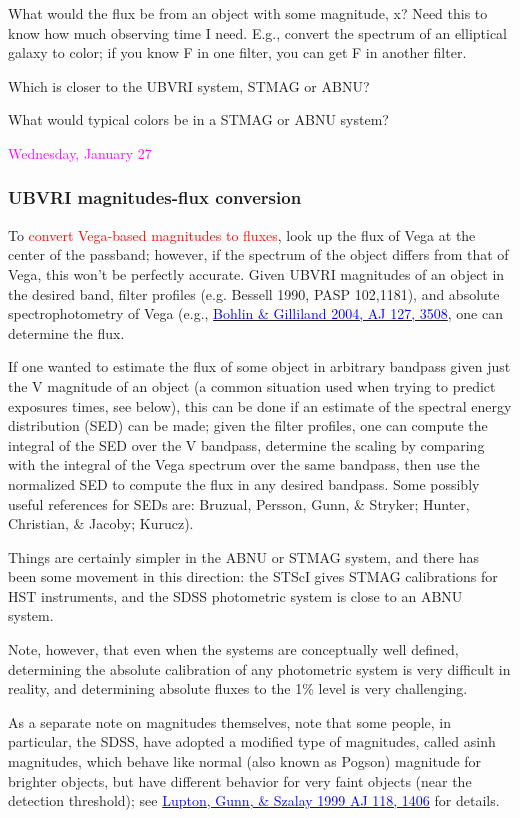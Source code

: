 \documentclass[12pt]{article}
\begin{document}
What would the flux be from an object with some magnitude,
x? Need this to know how much observing time I need. E.g., convert the
spectrum of an elliptical galaxy to color; if you know F in one
filter, you can get F in another filter.

Which is closer to the UBVRI system, STMAG or ABNU?

What would typical colors be in a STMAG or ABNU system?

\textcolor{magenta}{Wednesday, January 27}

\subsubsection*{UBVRI magnitudes-flux conversion
}
To \textcolor{red}{convert Vega-based magnitudes to fluxes},
look up the flux of Vega at the center of the passband;
however, if the spectrum of the object
differs from that of Vega, this won't be perfectly accurate.
Given UBVRI magnitudes of an object in the desired band, filter profiles
(e.g. Bessell 1990, PASP 102,1181), and absolute spectrophotometry of
Vega (e.g., \href{http://adsabs.harvard.edu/abs/2004AJ....127.3508B}
{\textcolor{blue}{Bohlin \& Gilliland 2004, AJ 127, 3508}},
one can determine the flux.

If one wanted to estimate the flux of some object in
arbitrary bandpass given just the V magnitude of an object (a common
situation used when trying to predict exposures times, see below),
this can be done if an estimate of the spectral energy distribution
(SED) can be made; given the filter profiles, one can compute the
integral of the SED over the V bandpass, determine the scaling by
comparing with the integral of the Vega spectrum over the same
bandpass, then use the normalized SED to compute the flux in any
desired bandpass. Some possibly useful references for SEDs are:
Bruzual, Persson, Gunn, \& Stryker; Hunter, Christian, \& Jacoby;
Kurucz).

Things are certainly simpler in the ABNU or STMAG system, and
there has been some movement in this direction: the STScI gives STMAG
calibrations for HST instruments, and the SDSS photometric system is
close to an ABNU system.

Note, however, that even when the systems are conceptually
well defined, determining the absolute calibration of any photometric
system is very difficult in reality, and determining absolute fluxes
to the 1\% level is very challenging.

As a separate note on magnitudes themselves, note that some
people, in particular, the SDSS, have adopted a modified type of
magnitudes, called asinh magnitudes, which behave like normal (also
known as Pogson) magnitude for brighter objects, but have different
behavior for very faint objects (near the detection threshold); see
\href{http://adsabs.harvard.edu/abs/1999AJ....118.1406L}
{\textcolor{blue}{Lupton, Gunn, \& Szalay 1999 AJ 118, 1406}}
for details.
\end{document}
